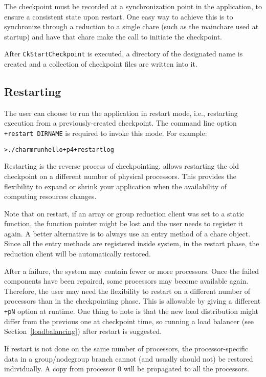 The checkpoint must be recorded at a synchronization point in the
application, to ensure a consistent state upon restart. One easy way
to achieve this is to synchronize through a reduction to a single
chare (such as the mainchare used at startup) and have that chare make
the call to initiate the checkpoint.

After {\tt CkStartCheckpoint} is executed, a directory of the
designated name is created and a collection of checkpoint files are
written into it.

\subsection{Restarting}

The user can choose to run the \charmpp{} application in restart mode,
i.e., restarting execution from a previously-created checkpoint. The
command line option {\tt +restart DIRNAME} is required to invoke this
mode. For example:

\begin{alltt}
  > ./charmrun hello +p4 +restart log
\end{alltt}

Restarting is the reverse process of checkpointing. \charmpp{} allows
restarting the old checkpoint on a different number of physical
processors.  This provides the flexibility to expand or shrink your
application when the availability of computing resources changes.

Note that on restart, if an array or group reduction client was set to a static
function, the function pointer might be lost and the user needs to
register it again. A better alternative is to always use an entry method
of a chare object. Since all the entry methods are registered
inside \charmpp{} system, in the restart phase, the reduction client
will be automatically restored.

After a failure, the system may contain fewer or more
processors. Once the failed components have been repaired, some
processors may become available again. Therefore, the user may need
the flexibility to restart on a different number of processors than in
the checkpointing phase. This is allowable by giving a different {\tt
+pN} option at runtime. One thing to note is that the new load
distribution might differ from the previous one at checkpoint time, so
running a load balancer (see Section~\ref{loadbalancing}) after
restart is suggested.

If restart is not done on the same number of processors, the
processor-specific data in a group/nodegroup branch cannot (and
usually should not) be restored individually. A copy from processor 0
will be propagated to all the processors.

